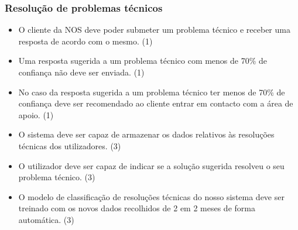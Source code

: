 \documentclass[11pt,a4paper]{article}
\newcommand{\requirement}[3]{
    #1 (#3)
}
\begin{document}
\begin{appendices}
\subsubsection{Resolução de problemas técnicos}
\begin{itemize}
    \setlength\itemsep{0em}
    \item \requirement{O cliente da NOS deve poder submeter um problema técnico e receber uma resposta de acordo com o mesmo.}
    {De forma a manter a satisfação e poder resolver os problemas dos clientes da NOS, a aplicação deve sempre enviar uma resposta 
    que considere ser a mais ajustada ao problema apresentado.}{1}
    \item \requirement{Uma resposta sugerida a um problema técnico com menos de 70\% de confiança não deve ser enviada.}
    {De forma a não induzir o cliente em erro, uma sugestão de resposta que não seja tomada como correta não deve ser enviada.}{1}
    \item \requirement{No caso da resposta sugerida a um problema técnico ter menos de 70\% de confiança deve ser recomendado ao cliente entrar em contacto com a área de apoio.}{O encaminhamento do cliente para a linha de apoio permite agilizar o atendimento do mesmo.}{1}
    \item \requirement{O sistema deve ser capaz de armazenar os dados relativos às resoluções técnicas dos utilizadores.}
    {Estes dados das resoluções obtidos a partir do nosso sistema podem ajudar a melhorar a precisão do nosso modelo de classificação.}{3}
    \item \requirement{O utilizador deve ser capaz de indicar se a solução sugerida resolveu o seu problema técnico.}
    {O \textit{feedback} dos utilizadores quanto à eficácia das soluções apresentadas é fulcral na melhoria do serviço.}{3}
    \item \requirement{O modelo de classificação de resoluções técnicas  do nosso sistema deve ser treinado com os novos dados recolhidos de 2 em 2 meses de forma automática.}
     {Certas classificações do nosso modelo podem deixar de ser as mais indicadas, por isso, para manter o modelo atualizado, automatizamos o treino do modelo com os eventuais dados recolhidos.}{3}
\end{itemize}


\end{appendices}
\end{document}
